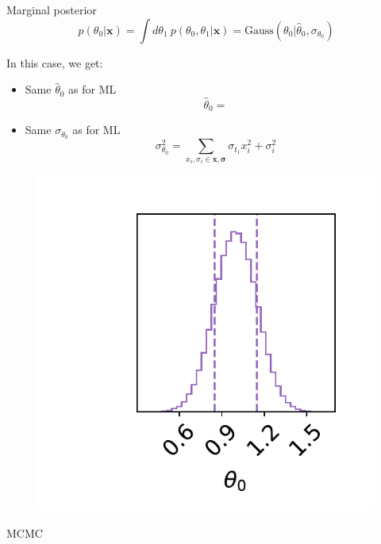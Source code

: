 \documentclass[
aspectratio=169,
14pt,
professionalfonts
]{beamer}
\begin{document}
\begin{frame}{Marginal posterior}
\vspace{-1cm}
    $$p(\theta_0|\mathbf{x}) = \int d\theta_1 ~ p(\theta_0, \theta_1|\mathbf{x}) = \text{Gauss}(\theta_0 | \hat \theta_0, \sigma_{\theta_0})$$
    \begin{minipage}{0.49\linewidth}
    In this case, we get: 
        \begin{itemize}
            \item Same $\hat \theta_0$ as for ML
            $$
            \hat \theta_0 = 
            $$
            \item Same $\sigma_{\theta_0}$ as for ML
            $$
            \sigma_{\theta_0}^2 = \sum_{x_i,  \sigma_i\in \mathbf{x}, \mathbf{\sigma}}\sigma_{t_1}x_i^2 + \sigma_i^2
            $$
        \end{itemize}
    \end{minipage}
    \begin{minipage}{0.49\linewidth}
    \begin{figure}
        \centering
        \includegraphics[width=0.9\linewidth]{../plots/marginal_posterior.pdf}
    \end{figure}
    \end{minipage}
\end{frame}

\begin{frame}
\center
\Large
MCMC
\end{frame}
\end{document}
